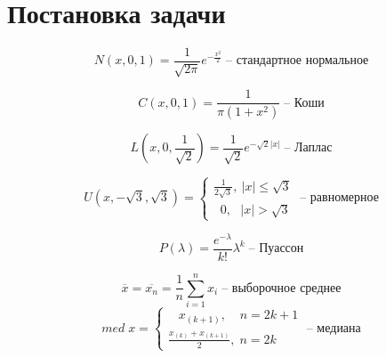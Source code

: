 \documentclass[12pt]{article}
\begin{document}



\tableofcontents
{}
\vfill ~
\setcounter{section}{0}



\newpage 
\section*{Постановка задачи}

\begin{equation}
	\label{dist:1}
	N(x, 0, 1) = \frac{1}{\sqrt{2\pi}}e^{-\frac{x^2}{2}} \;\text{-- стандартное нормальное}
\end{equation}
 
\begin{equation}
	C(x, 0, 1) = \frac{1}{\pi(1 + x^2)} \;\text{-- Коши} \label{dist:2}
\end{equation}

\begin{equation}
	L(x, 0, \frac{1}{\sqrt{2}}) = \frac{1}{\sqrt{2}}e^{{-\sqrt{2}|x|}} \;\text{-- Лаплас} \label{dist:3}
\end{equation}

\begin{equation} 
	U(x, -\sqrt{3}, \sqrt{3}) = 
    \begin{cases}
        \frac{1}{2\sqrt{3}}, \: |x| \leq \sqrt{3}\\
        \;\; 0, \:\:\:|x| > \sqrt{3}
    \end{cases}
    \;\text{-- равномерное} \label{dist:4}
\end{equation}

\begin{equation}
    P(\lambda) = \frac{e^{-\lambda}}{k!}\lambda^k \;\text{-- Пуассон} \label{dist:5}
\end{equation}


\begin{equation}
	\label{char:1}
	\overline{x} = \overline{x_n} = \frac{1}{n} \sum_{i=1}^{n}{x_i} \;\text{-- выборочное среднее}
\end{equation}
\begin{equation} 
	med \; x = 
    \begin{cases}
        \;\;\; x_{(k+1)}, \:\;\;\; n = 2k + 1 \\
        \frac{x_{(k)} + x_{(k+1)}}{2}, \; n = 2k
    \end{cases}
    \;\text{-- медиана} \label{char:2}
\end{equation}
\end{document}
